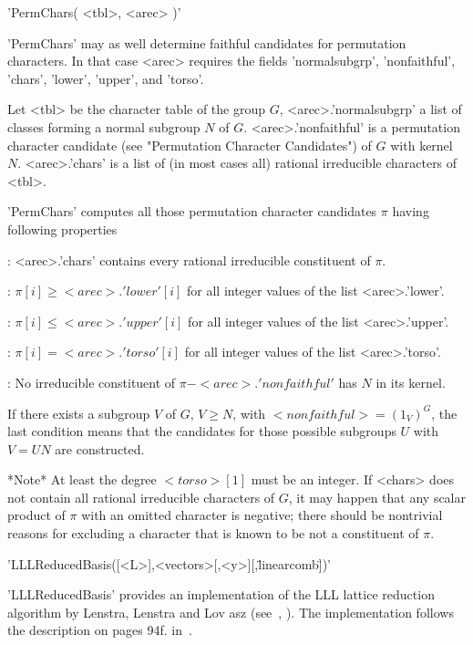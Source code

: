 'PermChars( <tbl>, <arec> )'

'PermChars' may as  well  determine faithful candidates  for  permutation
characters. In  that  case  <arec>  requires the  fields  'normalsubgrp',
'nonfaithful', 'chars', 'lower', 'upper', and 'torso'.

Let <tbl> be the character table  of the group $G$, <arec>.'normalsubgrp'
a   list   of  classes   forming   a   normal   subgroup   $N$  of   $G$.
<arec>.'nonfaithful'   is   a   permutation   character   candidate  (see
"Permutation   Character   Candidates")   of   $G$   with   kernel   $N$.
<arec>.'chars' is a  list  of (in  most cases  all)  rational irreducible
characters of <tbl>.

'PermChars' computes  all those  permutation character  candidates  $\pi$
having following properties\:

:  <arec>.'chars'  contains  every  rational  irreducible  constituent of
$\pi$.

:  $\pi[i] \geq  <arec>.'lower'[i]$ for  all integer  values of the  list
<arec>.'lower'.

:  $\pi[i] \leq <arec>.'upper'[i]$  for  all integer values  of  the list
<arec>.'upper'.

:  $\pi[i]  =  <arec>.'torso'[i]$  for  all  integer  values  of the list
<arec>.'torso'.

: No irreducible constituent of $\pi-<arec>.'nonfaithful'$ has $N$ in its
kernel.

If  there exists a subgroup $V$ of $G$, $V \geq N$, with $<nonfaithful> =
(1_V)^G$, the last condition means that the candidates for those possible
subgroups $U$ with $V = UN$ are constructed.

*Note*\:  At  least  the degree  $<torso>[1]$ must  be  an  integer.   If
<chars> does  not contain all  rational irreducible characters of $G$, it
may  happen that any scalar product of $\pi$ with an omitted character is
negative;  there should be nontrivial  reasons  for excluding a character
that is known to be not a constituent of $\pi$.

%
%
%

'LLLReducedBasis([<L>],<vectors>[,<y>][,\"linearcomb\"])'

'LLLReducedBasis' provides an implementation of the LLL lattice reduction
algorithm by  Lenstra, Lenstra and Lov{  a}sz (see~\cite{LLL82},
\cite{Poh87}).   The  implementation follows    the description on  pages
94f. in~\cite{Coh93}.

